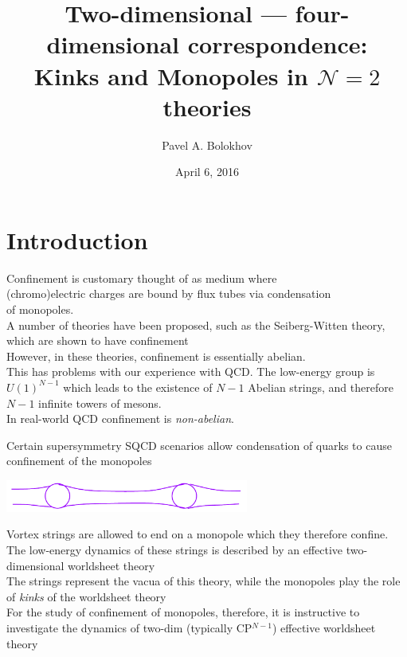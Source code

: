 \documentclass{beamer}
\title[Two-dim. --- four-dim. duality]
      {Two-dimensional --- four-dimensional correspondence:\\
	Kinks and Monopoles in $\mathcal{N}=2$ theories}
\author{Pavel A. Bolokhov}
\date{April 6, 2016}
\institute[UMD]{St.Petersburg State U. $ \cdot $ University of Minnesota Duluth}
\begin{document}
\maketitle

\section{Introduction}



\begin{frame}{}
	Confinement is customary thought of as medium where \\
	(chromo)electric charges are
	bound by flux tubes via condensation\\
	of monopoles. \\[4mm]

\pause
	A number of theories have been proposed, such as the Seiberg-Witten theory, which
	are shown to have confinement\\[4mm]

\pause
	However, in these theories, confinement is essentially abelian.\\[4mm]

\pause
	This has problems with our experience with QCD.
	The low-energy group is $ U(1)^{N-1} $ which leads to the existence of $ N-1 $ Abelian
	strings, and therefore $ N-1 $ infinite towers of mesons.\\[4mm]

\pause
	In real-world QCD confinement is \emph{non-abelian}.
\end{frame}


\begin{frame}{}
	Certain supersymmetry SQCD scenarios allow condensation of quarks to cause
	confinement of the monopoles

\begin{center}
\includegraphics[width=8.0cm]{str_mon.pdf}
\end{center}

\pause
	Vortex strings are allowed to end on a monopole which they therefore confine.
	The low-energy dynamics of these strings is described by an effective two-dimensional
	worldsheet theory\\[4mm]

\pause
	The strings represent the vacua of this theory, while the monopoles play the role
	of \emph{kinks} of the worldsheet theory\\[4mm]

\pause
	For the study of confinement of monopoles, therefore, it is instructive to investigate
	the dynamics of two-dim (typically CP$^{N-1}$) effective worldsheet theory
\end{frame}
\end{document}
